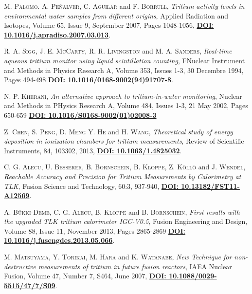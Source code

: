 \begin{thebibliography}{100}
 \textsc{M. Palomo}. \textsc{A. Peñalver}, \textsc{C. Aguilar} and \textsc{F. Borrull},
\textit{Tritium activity levels in environmental water samples from different origins}, Applied Radiation and Isotopes, Volume 65, Issue 9, September 2007, Pages 1048-1056, \href{https://doi.org/10.1016/j.apradiso.2007.03.013}{\textbf{DOI: 10.1016/j.apradiso.2007.03.013}}.

 \textsc{R. A. Sigg}, \textsc{J. E. McCarty}, \textsc{R. R. Livingston} and \textsc{M. A. Sanders},
\textit{Real-time aqueous tritium monitor using liquid scintillation counting}, FNuclear Instrument and Methods in Physics Research A, Volume 353, Issues 1-3, 30 Decembre 1994, Pages 494-498 \href{https://doi.org/10.1016/0168-9002(94)91707-8}{\textbf{DOI: 10.1016/0168-9002(94)91707-8}}.

 \textsc{N. P. Kherani},
\textit{An alternative approach to tritium-in-water monitoring}, Nuclear and Methods in PHysics Research A, Volume 484, Issues 1-3, 21 May 2002, Pages 650-659 \href{https://doi.org/10.1016/S0168-9002(01)02008-3}{\textbf{DOI: 10.1016/S0168-9002(01)02008-3}}

 \textsc{Z. Chen}, \textsc{S. Peng}, \textsc{D. Meng} \textsc{Y. He} and \textsc{H. Wang},
\textit{Theoretical study of energy deposition in ionization chambers for tritium measurements}, Review of Scientific Instruments, 84, 103302, 2013, \href{https://dx.doi.org/10.1063/1.4825032}{\textbf{DOI: 10.1063/1.4825032}}.

 \textsc{C. G. Alecu}, \textsc{U. Besserer}, \textsc{B. Bornschein}, \textsc{B. Kloppe}, \textsc{Z. Köllö} and \textsc{J. Wendel},
\textit{Reachable Accuracy and Precision for Tritium Measurements by Calorimetry at TLK}, Fusion Science and Technology, 60:3, 937-940, \href{https://doi.org/10.13182/FST11-A12569}{\textbf{DOI: 10.13182/FST11-A12569}}.

 \textsc{A. Bükki-Deme}, \textsc{C. G. Alecu}, \textsc{B. Kloppe} and \textsc{B. Bornschein},
\textit{First results with the upgraded TLK tritium calorimeter IGC-V0.5}, Fusion Engineering and Design, Volume 88, Issue 11, November 2013, Pages 2865-2869 \href{https://doi.org/10.1016/j.fusengdes.2013.05.066}{\textbf{DOI: 10.1016/j.fusengdes.2013.05.066}}.

 \textsc{M. Matsuyama}, \textsc{Y. Torikai}, \textsc{M. Hara} and \textsc{K. Watanabe},
\textit{New Technique for non-destructive measurements of tritium in future fusion reactors}, IAEA Nuclear Fusion, Volume 47, Number 7, S464, June 2007, \href{https://doi.org/10.1088/0029-5515/47/7/S09}{\textbf{DOI: 10.1088/0029-5515/47/7/S09}}.


\end{thebibliography}
